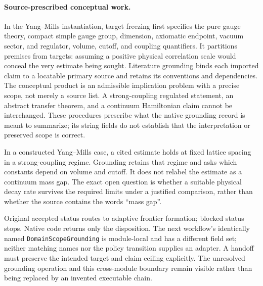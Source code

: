 \paragraph{Source-prescribed conceptual work.}
In the Yang--Mills instantiation, target freezing first specifies the pure gauge theory, compact simple gauge group, dimension, axiomatic endpoint, vacuum sector, and regulator, volume, cutoff, and coupling quantifiers. It partitions premises from targets: assuming a positive physical correlation scale would conceal the very estimate being sought. Literature grounding binds each imported claim to a locatable primary source and retains its conventions and dependencies. The conceptual product is an admissible implication problem with a precise scope, not merely a source list. A strong-coupling regulated statement, an abstract transfer theorem, and a continuum Hamiltonian claim cannot be interchanged. These procedures prescribe what the native grounding record is meant to summarize; its string fields do not establish that the interpretation or preserved scope is correct.

In a constructed Yang--Mills case, a cited estimate holds at fixed lattice spacing in a strong-coupling regime. Grounding retains that regime and asks which constants depend on volume and cutoff. It does not relabel the estimate as a continuum mass gap. The exact open question is whether a suitable physical decay rate survives the required limits under a justified comparison, rather than whether the source contains the words ``mass gap''.

Original accepted status routes to adaptive frontier formation; blocked status stops. Native code returns only the disposition. The next workflow's identically named \texttt{Domain\allowbreak Scope\allowbreak Grounding} is module-local and has a different field set; neither matching names nor the policy transition supplies an adapter. A handoff must preserve the intended target and claim ceiling explicitly. The unresolved grounding operation and this cross-module boundary remain visible rather than being replaced by an invented executable chain.



